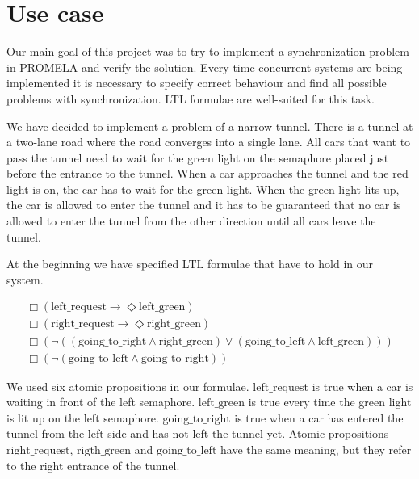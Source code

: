 
\section*{Use case}
\label{sec:use_case}

Our main goal of this project was to try to implement a synchronization problem in PROMELA and verify the solution. Every time concurrent systems are being implemented it is necessary to specify correct behaviour and find all possible problems with synchronization. LTL formulae are well-suited for this task.

We have decided to implement a problem of a narrow tunnel. There is a tunnel at a two-lane road where the road converges into a single lane. All cars that want to pass the tunnel need to wait for the green light on the semaphore placed just before the entrance to the tunnel. When a car approaches the tunnel and the red light is on, the car has to wait for the green light. When the green light lits up, the car is allowed to enter the tunnel and it has to be guaranteed that no car is allowed to enter the tunnel from the other direction until all cars leave the tunnel.

At the beginning we have specified LTL formulae that have to hold in our system.

\begin{eqnarray}
\Box(\mathrm{left\_request} \rightarrow \Diamond \mathrm{left\_green})
\label{formula:liveness1} \\
\Box(\mathrm{right\_request} \rightarrow \Diamond \mathrm{right\_green})
\label{formula:liveness2} \\
\Box(\neg((\mathrm{going\_to\_right} \wedge \mathrm{right\_green}) \vee
(\mathrm{going\_to\_left} \wedge \mathrm{left\_green})))
\label{formula:other_semaphore} \\
\Box(\neg(\mathrm{going\_to\_left} \wedge \mathrm{going\_to\_right}))
\label{formula:no_accident}
\end{eqnarray}

We used six atomic propositions in our formulae. $\mathrm{left\_request}$ is true when a car is waiting in front of the left semaphore. $\mathrm{left\_green}$ is true every time the green light is lit up on the left semaphore. $\mathrm{going\_to\_right}$ is true when a car has entered the tunnel from the left side and has not left the tunnel yet. Atomic propositions $\mathrm{right\_request}$, $\mathrm{rigth\_green}$ and $\mathrm{going\_to\_left}$ have the same meaning, but they refer to the right entrance of the tunnel.

